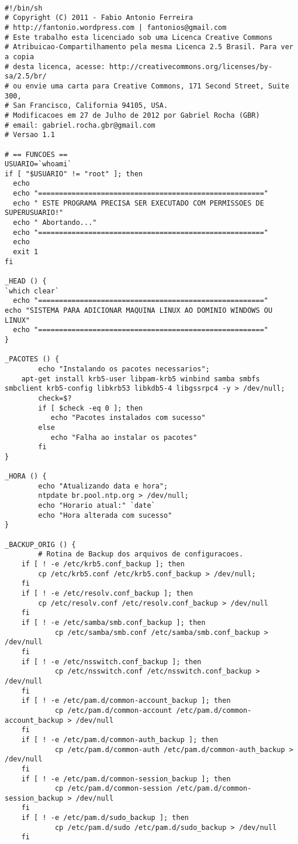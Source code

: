 \begin{lstlisting}

#!/bin/sh 
# Copyright (C) 2011 - Fabio Antonio Ferreira
# http://fantonio.wordpress.com | fantonios@gmail.com
# Este trabalho esta licenciado sob uma Licenca Creative Commons
# Atribuicao-Compartilhamento pela mesma Licenca 2.5 Brasil. Para ver a copia
# desta licenca, acesse: http://creativecommons.org/licenses/by-sa/2.5/br/
# ou envie uma carta para Creative Commons, 171 Second Street, Suite 300,
# San Francisco, California 94105, USA.
# Modificacoes em 27 de Julho de 2012 por Gabriel Rocha (GBR)
# email: gabriel.rocha.gbr@gmail.com
# Versao 1.1
 
# == FUNCOES ==
USUARIO=`whoami`
if [ "$USUARIO" != "root" ]; then
  echo
  echo "======================================================"
  echo " ESTE PROGRAMA PRECISA SER EXECUTADO COM PERMISSOES DE SUPERUSUARIO!"  
  echo " Abortando..."
  echo "======================================================"
  echo
  exit 1
fi
 
_HEAD () {
`which clear`
  echo "======================================================"
echo "SISTEMA PARA ADICIONAR MAQUINA LINUX AO DOMINIO WINDOWS OU LINUX"
  echo "======================================================"
}
 
_PACOTES () {
        echo "Instalando os pacotes necessarios";       
	apt-get install krb5-user libpam-krb5 winbind samba smbfs smbclient krb5-config libkrb53 libkdb5-4 libgssrpc4 -y > /dev/null;
        check=$?
        if [ $check -eq 0 ]; then
           echo "Pacotes instalados com sucesso"
        else
           echo "Falha ao instalar os pacotes"
        fi
}
 
_HORA () {
        echo "Atualizando data e hora";
        ntpdate br.pool.ntp.org > /dev/null;
        echo "Horario atual:" `date`
        echo "Hora alterada com sucesso"
}
 
_BACKUP_ORIG () {
        # Rotina de Backup dos arquivos de configuracoes.
	if [ ! -e /etc/krb5.conf_backup ]; then
		cp /etc/krb5.conf /etc/krb5.conf_backup > /dev/null;
	fi
	if [ ! -e /etc/resolv.conf_backup ]; then
		cp /etc/resolv.conf /etc/resolv.conf_backup > /dev/null
	fi
	if [ ! -e /etc/samba/smb.conf_backup ]; then
        	cp /etc/samba/smb.conf /etc/samba/smb.conf_backup > /dev/null
	fi
	if [ ! -e /etc/nsswitch.conf_backup ]; then
        	cp /etc/nsswitch.conf /etc/nsswitch.conf_backup > /dev/null
	fi
	if [ ! -e /etc/pam.d/common-account_backup ]; then
	        cp /etc/pam.d/common-account /etc/pam.d/common-account_backup > /dev/null
	fi
	if [ ! -e /etc/pam.d/common-auth_backup ]; then
	        cp /etc/pam.d/common-auth /etc/pam.d/common-auth_backup > /dev/null
	fi
	if [ ! -e /etc/pam.d/common-session_backup ]; then
	        cp /etc/pam.d/common-session /etc/pam.d/common-session_backup > /dev/null
	fi
	if [ ! -e /etc/pam.d/sudo_backup ]; then
	        cp /etc/pam.d/sudo /etc/pam.d/sudo_backup > /dev/null
	fi
         

\end{lstlisting}
